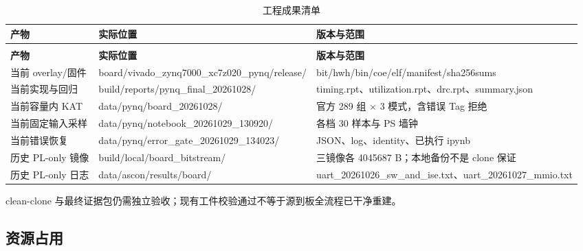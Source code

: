 {\small
\renewcommand{\thetable}{3-2}
\begin{longtable}{@{}>{\raggedright\arraybackslash}p{}>{\raggedright\arraybackslash}p{}>{\raggedright\arraybackslash}p{}@{}}
\caption{工程成果清单}\label{tab:3-2}\\
\toprule
\textbf{产物} & \textbf{实际位置} & \textbf{版本与范围} \\
\midrule
\endfirsthead
\multicolumn{3}{@{}l}{\footnotesize 续表 3-2}\\
\toprule
\textbf{产物} & \textbf{实际位置} & \textbf{版本与范围} \\
\midrule
\endhead
当前 overlay/固件 & board/vivado\_\allowbreak{}zynq7000\_\allowbreak{}xc7z020\_\allowbreak{}pynq/release/ & bit/\allowbreak{}hwh/\allowbreak{}bin/\allowbreak{}coe/\allowbreak{}elf/\allowbreak{}manifest/\allowbreak{}sha256sums \\
当前实现与回归 & build/\allowbreak{}reports/\allowbreak{}pynq\_\allowbreak{}final\_\allowbreak{}20261028/ & timing.rpt、utilization.rpt、drc.rpt、summary.json \\
当前容量内 KAT & data/pynq/board\_\allowbreak{}20261028/ & 官方 289 组 $\times$ 3 模式，含错误 Tag 拒绝 \\
当前固定输入采样 & data/\allowbreak{}pynq/\allowbreak{}notebook\_\allowbreak{}20261029\_\allowbreak{}130920/ & 各档 30 样本与 PS 墙钟 \\
当前错误恢复 & data/pynq/error\_\allowbreak{}gate\_\allowbreak{}20261029\_\allowbreak{}134023/ & JSON、log、identity、已执行 ipynb \\
历史 PL-only 镜像 & build/\allowbreak{}local/\allowbreak{}board\_\allowbreak{}bitstream/ & 三镜像各 4045687 B；本地备份不是 clone 保证 \\
历史 PL-only 日志 & data/\allowbreak{}ascon/\allowbreak{}results/\allowbreak{}board/\allowbreak{} & uart\_\allowbreak{}20261026\_\allowbreak{}sw\_\allowbreak{}and\_\allowbreak{}ise.txt、uart\_\allowbreak{}20261027\_\allowbreak{}mmio.txt \\
\bottomrule
\end{longtable}
}

clean-clone 与最终证据包仍需独立验收；现有工件校验通过不等于源到板全流程已干净重建。

\Needspace{85pt}

\subsection{资源占用}

